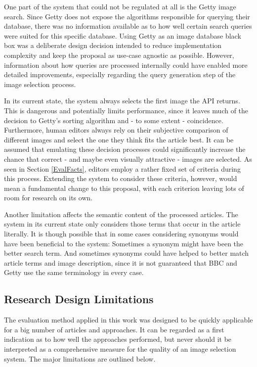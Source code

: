 \documentclass[11pt,a4paper,twoside]{article}
\begin{document}
One part of the system that could not be regulated at all is the Getty image search. Since Getty does not expose the algorithms responsible for querying their database, there was no information available as to how well certain search queries were suited for this specific database. Using Getty as an image database black box was a deliberate design decision intended to reduce implementation complexity and keep the proposal as use-case agnostic as possible. However, information about how queries are processed internally could have enabled more detailed improvements, especially regarding the query generation step of the image selection process.

In its current state, the system always selects the first image the API returns. This is dangerous and potentially limits performance, since it leaves much of the decision to Getty's sorting algorithm and - to some extent - coincidence. Furthermore, human editors always rely on their subjective comparison of different images and select the one they think fits the article best. It can be assumed that emulating these decision processes could significantly increase the chance that correct - and maybe even visually attractive - images are selected. As seen in Section \ref{EvalFacts}, editors employ a rather fixed set of criteria during this process. Extending the system to consider these criteria, however, would mean a fundamental change to this proposal, with each criterion leaving lots of room for research on its own.

Another limitation affects the semantic content of the processed articles. The system in its current state only considers those terms that occur in the article literally. It is though possible that in some cases considering synonyms would have been beneficial to the system: Sometimes a synonym might have been the better search term. And sometimes synonyms could have helped to better match article terms and image description, since it is not guaranteed that BBC and Getty use the same terminology in every case.

\subsection{Research Design Limitations} \label{LimitsEval}

The evaluation method applied in this work was designed to be quickly applicable for a big number of articles and approaches. It can be regarded as a first indication as to how well the approaches performed, but never should it be interpreted as a comprehensive measure for the quality of an image selection system. The major limitations are outlined below.
\end{document}
